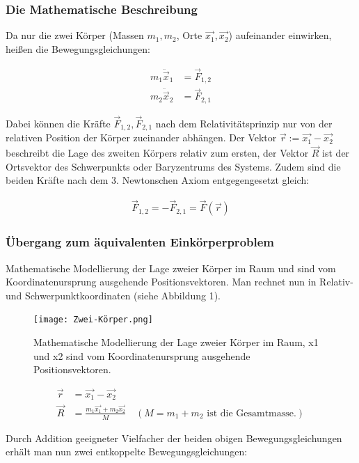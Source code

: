 \documentclass[a4paper,12pt,twoside]{article}
\begin{document}
\subsubsection{Die Mathematische Beschreibung}

Da nur die zwei Körper (Massen \( m_1, m_2 \), Orte \( \vec{x_1}, \vec{x_2} \)) aufeinander einwirken, heißen die Bewegungsgleichungen:

\begin{align*}
	m_1 \ddot{\vec{x}}_1 &= \vec{F}_{1,2} \\
	m_2 \ddot{\vec{x}}_2 &= \vec{F}_{2,1}
\end{align*}

Dabei können die Kräfte \( \vec{F}_{1,2}, \vec{F}_{2,1} \) nach dem Relativitätsprinzip nur von der relativen Position der Körper zueinander abhängen. Der Vektor \( \vec{r} := \vec{x_1} - \vec{x_2} \) beschreibt die Lage des zweiten Körpers relativ zum ersten, der Vektor \( \vec{R} \) ist der Ortsvektor des Schwerpunkts oder Baryzentrums des Systems. Zudem sind die beiden Kräfte nach dem 3. Newtonschen Axiom entgegengesetzt gleich:

\begin{align*}
\vec{F}_{1,2} = -\vec{F}_{2,1} = \vec{F}(\vec{r})
\end{align*}

\subsubsection{Übergang zum äquivalenten Einkörperproblem}
Mathematische Modellierung der Lage zweier Körper im Raum und sind vom Koordinatenursprung 
ausgehende Positionsvektoren. Man rechnet nun in Relativ- und Schwerpunktkoordinaten (siehe Abbildung 1).
\begin{figure}[H]
	\centering
	\texttt{[image: Zwei-Körper.png]}
	\caption[Eintrag in Abbildungsverzeichnis von Grumpy Cat]{Mathematische Modellierung der Lage zweier Körper im Raum, x1 und x2 sind vom Koordinatenursprung ausgehende Positionsvektoren.}
	\label{Zwei-Körper .}
\end{figure}

\begin{align*}
	\vec{r} &= \vec{x_1} - \vec{x_2} \\
	\vec{R} &= \frac{m_1 \vec{x_1} + m_2 \vec{x_2}}{M} \quad (M = m_1 + m_2 \text{ ist die Gesamtmasse.})
\end{align*}

Durch Addition geeigneter Vielfacher der beiden obigen Bewegungsgleichungen erhält man nun zwei entkoppelte Bewegungsgleichungen:
\end{document}
